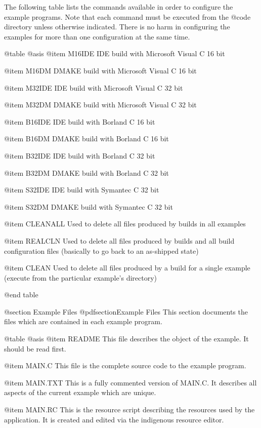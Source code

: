 The following table lists the commands available in order to configure
the example programs.  Note that each command must be executed from the
@code{\DYNACE\WINEXAM\SETUP} directory unless otherwise indicated.
There is no harm in configuring the examples for more than one
configuration at the same time.

@table @asis
@item M16IDE
IDE build with Microsoft Visual C 16 bit

@item M16DM
DMAKE build with Microsoft Visual C 16 bit

@item M32IDE
IDE build with Microsoft Visual C 32 bit

@item M32DM
DMAKE build with Microsoft Visual C 32 bit

@item B16IDE
IDE build with Borland C 16 bit

@item B16DM
DMAKE build with Borland C 16 bit

@item B32IDE
IDE build with Borland C 32 bit

@item B32DM
DMAKE build with Borland C 32 bit

@item S32IDE
IDE build with Symantec C 32 bit

@item S32DM
DMAKE build with Symantec C 32 bit

@item CLEANALL
Used to delete all files produced by builds in all examples

@item REALCLN
Used to delete all files produced by builds and all build configuration
files (basically to go back to an as-shipped state)

@item CLEAN
Used to delete all files produced by a build for a single example
(execute from the particular example's directory)

@end table




@section Example Files
@pdfsection{Example Files}
This section documents the files which are contained in each example
program.

@table @asis
@item README
This file describes the object of the example.  It should be read
first.

@item MAIN.C
This file is the complete source code to the example program.

@item MAIN.TXT
This is a fully commented version of MAIN.C.  It describes all aspects
of the current example which are unique.

@item MAIN.RC
This is the resource script describing the resources used by the application.
It is created and edited via the indigenous resource editor.


